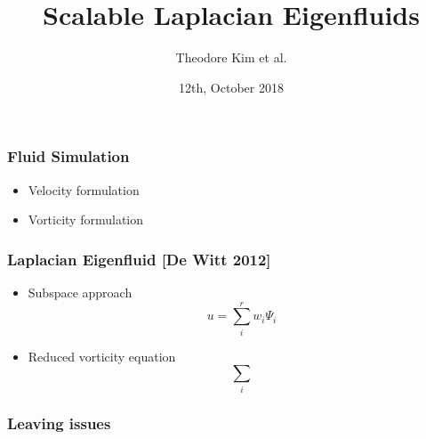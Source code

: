 \documentclass[serif,mathserif, 12pt]{beamer}
\title[\hspace{2em}\insertframenumber/\inserttotalframenumber]{Scalable Laplacian Eigenfluids}
\date{12th, October 2018}
\author{Theodore Kim et al.}
\begin{document}
\maketitle

\begin{frame}
  \frametitle{Fluid Simulation}
  \begin{itemize}
  \item Velocity formulation
  \item Vorticity formulation
  \end{itemize}
\end{frame}

\begin{frame}
  \frametitle{Laplacian Eigenfluid [De Witt 2012]}
  \begin{itemize}
  \item Subspace approach
    \[
    u = \sum_i^r w_i \Psi_i
    \]
  \item Reduced vorticity equation
    \[
    \sum_i
    \]
  \end{itemize}
\end{frame}

\begin{frame}
  \frametitle{Leaving issues}
  
\end{frame}

\begin{frame} 
\end{frame}

\begin{frame} 
\end{frame}
\end{document}

